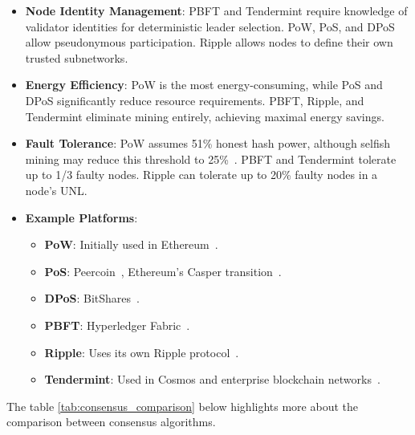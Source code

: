 \begin{itemize}
  \item \textbf{Node Identity Management}:  
  PBFT and Tendermint require knowledge of validator identities for deterministic leader selection. PoW, PoS, and DPoS allow pseudonymous participation. Ripple allows nodes to define their own trusted subnetworks.

  \item \textbf{Energy Efficiency}:  
  PoW is the most energy-consuming, while PoS and DPoS significantly reduce resource requirements. PBFT, Ripple, and Tendermint eliminate mining entirely, achieving maximal energy savings.

  \item \textbf{Fault Tolerance}:  
  PoW assumes 51\% honest hash power, although selfish mining may reduce this threshold to 25\%~\cite{eyal2014majority}. PBFT and Tendermint tolerate up to 1/3 faulty nodes. Ripple can tolerate up to 20\% faulty nodes in a node’s UNL.

  \item \textbf{Example Platforms}:  
  \begin{itemize}
    \item \textbf{PoW}: Initially used in Ethereum~\cite{wood2014ethereum}.  
    \item \textbf{PoS}: Peercoin~\cite{king2012ppcoin}, Ethereum’s Casper transition~\cite{zamfir2015casper}.  
    \item \textbf{DPoS}: BitShares~\cite{bitshares2016}.  
    \item \textbf{PBFT}: Hyperledger Fabric~\cite{hyperledger2015}.  
    \item \textbf{Ripple}: Uses its own Ripple protocol~\cite{schwartz2014ripple}.  
    \item \textbf{Tendermint}: Used in Cosmos and enterprise blockchain networks~\cite{kwon2014tendermint}.
  \end{itemize}
\end{itemize}
The table \ref{tab:consensus_comparison} below highlights more about the comparison between consensus algorithms. 

